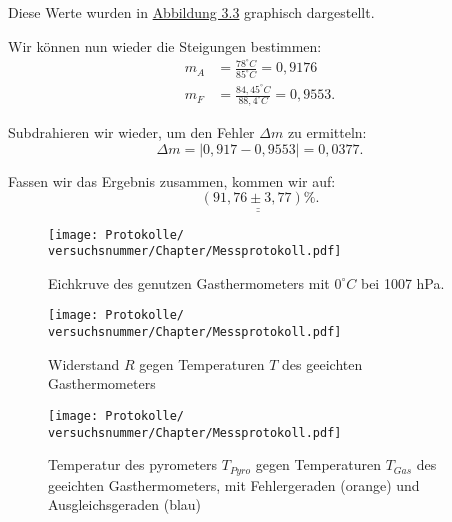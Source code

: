 Diese Werte wurden in \hyperref[fig:t_gegen_t]{Abbildung 3.3} graphisch dargestellt.

Wir können nun wieder die Steigungen bestimmen:
\begin{align}
    m_A &= \frac{78 ^\circ C}{85 ^\circ C} = 0,9176 \\
    m_F &= \frac{84,45 ^\circ C}{88,4 ^\circ C} = 0,9553.
\end{align}

Subdrahieren wir wieder, um den Fehler $\Delta m$ zu ermitteln:
\begin{equation}
    \Delta m = \left| 0,917 - 0,9553 \right| = 0,0377.
\end{equation}

Fassen wir das Ergebnis zusammen, kommen wir auf:
\begin{equation}
    \underline{\underline{(91,76 \pm 3,77)\%}}.
\end{equation}

\onecolumn
\begin{figure}
    \texttt{[image: Protokolle/\\versuchsnummer/Chapter/Messprotokoll.pdf]}
    \caption{Eichkruve des genutzen Gasthermometers mit $0^\circ C$ bei 1007 hPa.}
    \label{fig:graphisch_temp_druck}
\end{figure}

\begin{figure}
    \texttt{[image: Protokolle/\\versuchsnummer/Chapter/Messprotokoll.pdf]}
    \caption{Widerstand $R$ gegen Temperaturen $T$ des geeichten Gasthermometers}
    \label{fig:graphisch_temp_widerstand}
\end{figure}

\begin{figure}
    \texttt{[image: Protokolle/\\versuchsnummer/Chapter/Messprotokoll.pdf]}
    \caption{Temperatur des pyrometers $T_{Pyro}$ gegen Temperaturen $T_{Gas}$ des geeichten Gasthermometers, mit Fehlergeraden (orange) und Ausgleichsgeraden (blau)}
    \label{fig:t_gegen_t}
\end{figure}
\twocolumn

